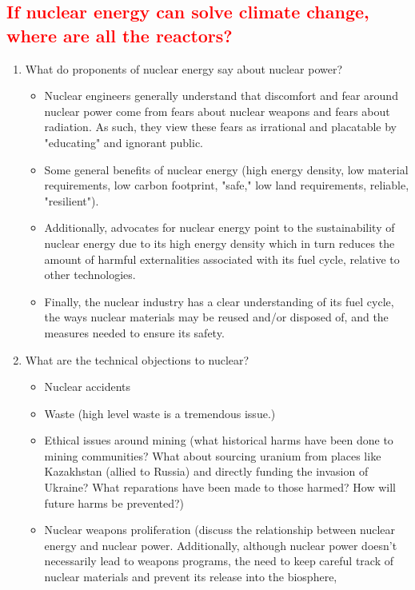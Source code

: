 \subsection{\textcolor{red}{If nuclear energy can solve climate change, where are all the reactors?}}

\begin{enumerate}
\item What do proponents of nuclear energy say about nuclear power?
\begin{itemize}
    \item Nuclear engineers generally understand that discomfort and fear 
    around nuclear power come from fears about nuclear weapons and fears 
    about radiation. As such, they view these fears as irrational and placatable
    by "educating" and ignorant public.
    \item Some general benefits of nuclear energy (high energy density, low
    material requirements, low carbon footprint, "safe," low land requirements,
    reliable, "resilient").
    \item Additionally, advocates for nuclear energy point to the sustainability 
    of nuclear energy due to its high energy density which in turn reduces the 
    amount of harmful externalities associated with its fuel cycle, relative to
    other technologies.
    \item Finally, the nuclear industry has a clear understanding of its fuel cycle, the ways
    nuclear materials may be reused and/or disposed of, and the measures needed to ensure its
    safety.
\end{itemize}
\item What are the technical objections to nuclear?
\begin{itemize}
    \item Nuclear accidents
    \item Waste (high level waste is a tremendous issue.)
    \item Ethical issues around mining (what historical harms have been done
    to mining communities? What about sourcing uranium from places like 
    Kazakhstan (allied to Russia) and directly funding the invasion of Ukraine?
    What reparations have been made to those harmed? How will future harms be prevented?)
    \item Nuclear weapons proliferation (discuss the relationship between
    nuclear energy and nuclear power. Additionally, although nuclear power 
    doesn't necessarily lead to weapons programs, the need to keep careful
    track of nuclear materials and prevent its release into the biosphere, 

\end{itemize}
\end{enumerate}
